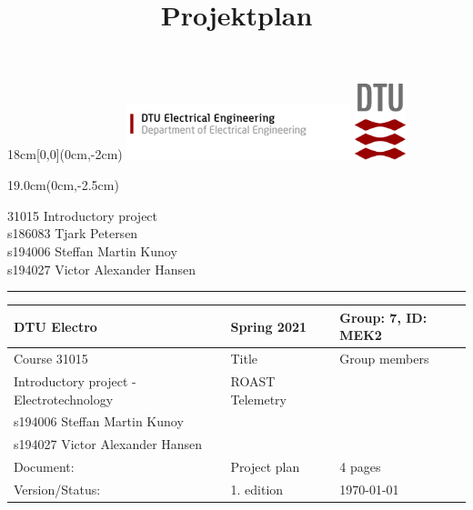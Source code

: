 \documentclass[]{article}
\title{Projektplan}
\begin{document}
\thispagestyle{empty}
\vspace*{-1.9cm}
\begin{textblock*}{18cm}[0,0](0cm,-2cm) %
  \noindent
  \includegraphics[width=6.5cm,valign=t]{documentation/resources/Stor-mobil-top_DTU_Elektro_UK.png}
  \hspace*{8.6cm}
  \includegraphics[width=1.5cm,valign=t]{documentation/resources/tex_dtu_logo.pdf}
\end{textblock*}
\begin{textblock*}{19.0cm}(0cm,-2.5cm) %
\begin{center}
  {\color{dtured}\large31015 Introductory project}\\
  \normalsize
  s186083 Tjark Petersen\\
  s194006 Steffan Martin Kunoy\\
  s194027 Victor Alexander Hansen\\
\end{center}
\end{textblock*}
\vspace{1mm}
{\hspace*{-0.1cm}
\color{dtured}\noindent \rule{16.8cm}{5pt}}

 
\begin{table}[H]
     \centering
     \begin{tabularx}{\textwidth}{|X|X|X|}
     \hline
          DTU Electro&Spring 2021 & Group: 7, ID: MEK2 \\\hline
          Course 31015 & Title & Group members \\\hline
          Introductory project - Electrotechnology & ROAST Telemetry & \begin{tabular}{l} s186083 Tjark Petersen\\s194006 Steffan Martin Kunoy\\s194027 Victor Alexander Hansen \end{tabular}\\\hline
          Document:& Project plan & 4 pages\\\hline 
          Version/Status: & 1. edition &\today\\\hline
     \end{tabularx}
 \end{table}
 
\end{document}
